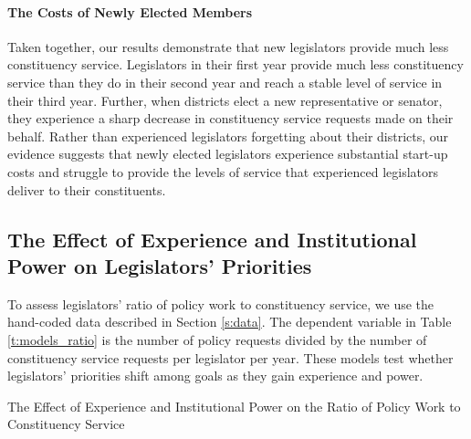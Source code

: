 \documentclass[12pt]{article}
\begin{document}
\paragraph{The Costs of Newly Elected Members} Taken together, our results demonstrate that new legislators provide much less constituency service. Legislators in their first year provide much less constituency service than they do in their second year and reach a stable level of service in their third year. Further, when districts elect a new representative or senator, they experience a sharp decrease in constituency service requests made on their behalf. Rather than experienced legislators forgetting about their districts, our evidence suggests that newly elected legislators experience substantial start-up costs and struggle to provide the levels of service that experienced legislators deliver to their constituents.  


\subsection{The Effect of Experience and Institutional Power on Legislators' Priorities}\label{s:priority} 

To assess legislators' ratio of policy work to constituency service, we use the hand-coded data described in Section \ref{s:data}. The dependent variable in Table \ref{t:models_ratio} is the number of policy requests divided by the number of constituency service requests per legislator per year. These models test whether legislators' priorities shift among goals as they gain experience and power.

\begin{table}
\begin{center}
\begin{minipage}{\textwidth}
\caption{The Effect of Experience and Institutional Power on the Ratio of Policy Work to Constituency Service} \label{t:models_ratio}
\centering
\end{minipage}
\end{center}
\end{table}
\end{document}
